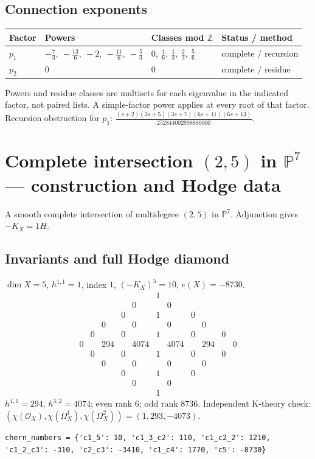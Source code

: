 \documentclass[10pt,a4paper]{article}
\begin{document}
\subsection*{Connection exponents}
\begin{center}\begin{tabular}{llll}\toprule Factor & Powers & Classes mod $\mathbb Z$ & Status / method\\\midrule
$p_{1}$ & $- \frac{7}{3},\ - \frac{13}{6},\ -2,\ - \frac{11}{6},\ - \frac{5}{3}$ & $0,\ \frac{1}{6},\ \frac{1}{3},\ \frac{2}{3},\ \frac{5}{6}$ & complete / recursion\\
$p_{2}$ & $0$ & $0$ & complete / residue\\
\bottomrule\end{tabular}\end{center}
Powers and residue classes are multisets for each eigenvalue in the indicated factor, not paired lists. A simple-factor power applies at every root of that factor.
Recursion obstruction for $p_{1}$: $\frac{\left(s + 2\right) \left(3 s + 5\right) \left(3 s + 7\right) \left(6 s + 11\right) \left(6 s + 13\right)}{252844002938880000}$.
\clearpage\section*{Complete intersection $(2,5)$ in $\mathbb P^{7}$ --- construction and Hodge data}\label{entry:PCI5-2-5}
A smooth complete intersection of multidegree $(2,5)$ in $\mathbb P^{7}$.
Adjunction gives $-K_X=1H$.
\subsection*{Invariants and full Hodge diamond}
$\dim X=5$, $h^{1,1}=1$, index $1$, $(-K_X)^5=10$, $e(X)=-8730$.
\[\begin{array}{ccccccccccc}&&&&&1&&&&&\\&&&&0&&0&&&&\\&&&0&&1&&0&&&\\&&0&&0&&0&&0&&\\&0&&0&&1&&0&&0&\\0&&294&&4074&&4074&&294&&0\\&0&&0&&1&&0&&0&\\&&0&&0&&0&&0&&\\&&&0&&1&&0&&&\\&&&&0&&0&&&&\\&&&&&1&&&&&\end{array}\]
$h^{4,1}=294$, $h^{3,2}=4074$; even rank 6; odd rank 8736.
Independent K-theory check: $(\chi(\mathcal O_X),\chi(\Omega_X^1),\chi(\Omega_X^2))=(1, 293, -4073)$.
\begin{lstlisting}
chern_numbers = {'c1_5': 10, 'c1_3_c2': 110, 'c1_c2_2': 1210, 'c1_2_c3': -310, 'c2_c3': -3410, 'c1_c4': 1770, 'c5': -8730}
\end{lstlisting}
\end{document}
